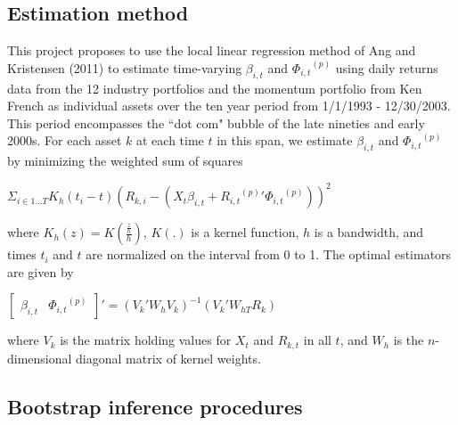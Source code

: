 \documentclass{article}
\begin{document}
\subsection*{Estimation method}
This project proposes to use the local linear regression method of Ang and Kristensen (2011) to estimate time-varying \(\beta_{i,t}\) and  \({\Phi_{i,t}}^{(p)}\) using daily returns data from the 12 industry portfolios and the momentum portfolio from Ken French as individual assets over the ten year period from 1/1/1993 - 12/30/2003. This period encompasses the ``dot com" bubble of the late nineties and early 2000s. For each asset \(k\) at each time \(t\) in this span, we estimate \(\beta_{i,t}\) and  \({\Phi_{i,t}}^{(p)}\)  by minimizing the weighted sum of squares 
\newline
\begin{center}\(\Sigma_{i \in 1...T} K_{h}(t_{i} - t) (R_{k,i} - (X_{t}\beta_{i,t} + {{R_{i,t}}^{(p)}}' {\Phi_{i,t}}^{(p)}))^{2}\)\end{center}
where \(K_{h}(z) = K(\frac{\frac{z}{h}}{h})\), \(K(.)\) is a kernel function, \(h\) is a bandwidth, and times \(t_{i}\) and \(t\) are normalized on the interval from 0 to 1. The optimal estimators are given by 
\newline
\begin{center}\({\begin{bmatrix}\beta_{i,t} &{\Phi_{i,t}}^{(p)}\end{bmatrix}}' = ({V_{k}}'W_{h}V_{k})^{-1}(V_{k}'W_{hT}R_{k})\)\end{center}
where \(V_{k}\) is the matrix holding values for \(X_{t}\)  and \(R_{k,t}\) in all \(t\), and \(W_{h}\) is the \(n\)-dimensional diagonal matrix of kernel weights.

\subsection*{Bootstrap inference procedures}
\end{document}
